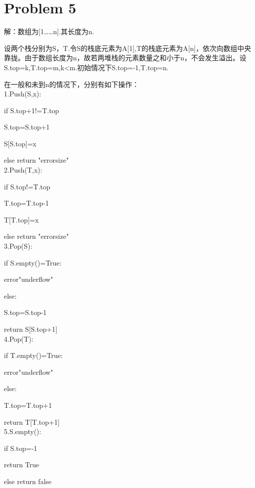 \documentclass[12pt,a4paper]{article}
\begin{document}
\section{Problem 5}
解：数组为[1……n].其长度为n.\par
设两个栈分别为S，T.令S的栈底元素为A[1],T的栈底元素为A[n]，依次向数组中央靠拢。由于数组长度为n，故若两堆栈的元素数量之和小于n，不会发生溢出。设S.top=k,T.top=m,k<m.初始情况下S.top=-1,T.top=n.\par
在一般和未到n的情况下，分别有如下操作：\\
1.Push(S,x):
\par\setlength\parindent{2em}if S.top+1!=T.top
\par\setlength\parindent{4em}S.top=S.top+1
\par\setlength\parindent{4em}S[S.top]=x
\par\setlength\parindent{2em}else return "errorsize"\\
2.Push(T,x):
\par\setlength\parindent{2em}if S.top!=T.top
\par\setlength\parindent{4em}T.top=T.top-1
\par\setlength\parindent{4em}T[T.top]=x
\par\setlength\parindent{2em}else return "errorsize"\\
3.Pop(S):
\par\setlength\parindent{2em}if S.empty()=True:
\par\setlength\parindent{4em}error"underflow"
\par\setlength\parindent{2em}else:
\par\setlength\parindent{4em}S.top=S.top-1
\par\setlength\parindent{4em}return S[S.top+1]\\
4.Pop(T):
\par\setlength\parindent{2em}if T.empty()=True:
\par\setlength\parindent{4em}error"underflow"
\par\setlength\parindent{2em}else:
\par\setlength\parindent{4em}T.top=T.top+1
\par\setlength\parindent{2em}return T[T.top+1]\\
5.S.empty():
\par\setlength\parindent{2em}if S.top=-1
\par\setlength\parindent{4em}return True
\par\setlength\parindent{2em}else return false\\
\end{document}
